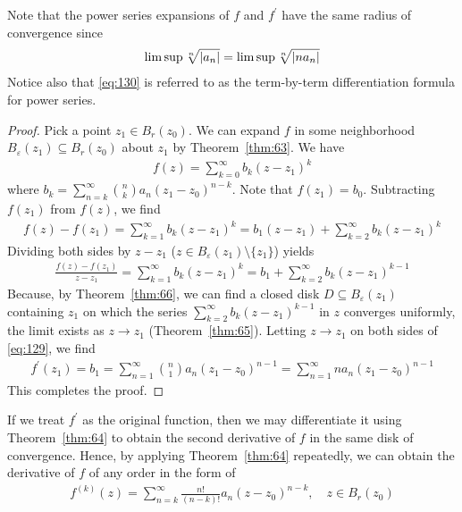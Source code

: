 \documentclass[thmcnt=section, 12pt]{my-elegantbook}
\begin{document}
\begin{note}
    Note that the power series expansions of $f$ and $f^\prime$ have the same radius of convergence since
    \begin{align*}
        \limsup{\sqrt[n]{\left\lvert a_n \right\rvert}}
        = \limsup{\sqrt[n]{\left\lvert n a_n \right\rvert}}
    \end{align*}
    Notice also that \eqref{eq:130} is referred to as the term-by-term differentiation formula for power series.
\end{note}

\begin{proof}
    Pick a point $z_1 \in B_r(z_0)$. We can expand $f$ in some neighborhood $B_{\varepsilon}(z_1) \subseteq B_r(z_0)$ about $z_1$ by Theorem~\ref{thm:63}. We have 
    \begin{align*}
        f(z) = \sum_{k=0}^\infty b_k (z - z_1)^k
    \end{align*}
    where $b_k = \sum_{n=k}^\infty \binom{n}{k} a_n (z_1 - z_0)^{n-k}$. Note that $f(z_1) = b_0$. Subtracting $f(z_1)$ from $f(z)$, we find 
    \begin{align*}
        f(z) - f(z_1)
        = \sum_{k=1}^\infty b_k (z - z_1)^k
        = b_1 (z - z_1) + \sum_{k=2}^\infty b_k (z - z_1)^k
    \end{align*}
    Dividing both sides by $z - z_1$ ($z \in B_\varepsilon(z_1) \setminus \{z_1\}$) yields 
    \begin{align}
        \frac{f(z) - f(z_1)}{z - z_1}
        = \sum_{k=1}^\infty b_k (z - z_1)^k
        = b_1 + \sum_{k=2}^\infty b_k (z - z_1)^{k-1}
        \label{eq:129}
    \end{align}
    Because, by Theorem~\ref{thm:66}, we can find a closed disk $D \subseteq B_{\varepsilon}(z_1)$ containing $z_1$ on which the series $\sum_{k=2}^\infty b_k (z - z_1)^{k-1}$ in $z$ converges uniformly, the limit exists as $z \to z_1$ (Theorem~\ref{thm:65}). Letting $z \to z_1$ on both sides of \eqref{eq:129}, we find
    \begin{align*}
        f^\prime(z_1)
        = b_1
        = \sum_{n=1}^\infty \binom{n}{1} a_n (z_1 - z_0)^{n-1}
        = \sum_{n=1}^\infty n a_n (z_1 - z_0)^{n-1}
    \end{align*}
    This completes the proof.
\end{proof}

If we treat $f^\prime$ as the original function, then we may differentiate it using Theorem~\ref{thm:64} to obtain the second derivative of $f$ in the same disk of convergence. Hence, by applying Theorem~\ref{thm:64} repeatedly, we can obtain the derivative of $f$ of any order in the form of 
\begin{align}
    f^{(k)}(z)
        = \sum_{n=k}^\infty \frac{n!}{(n-k)!} a_n (z - z_0)^{n-k},
        \quad z \in B_r(z_0)
    \label{eq:131}
\end{align}
\end{document}
